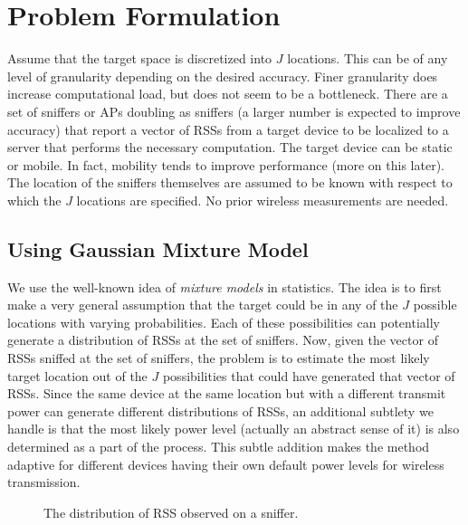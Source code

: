 
\section{Problem Formulation}
\label{sec:problemformulation}

Assume that the target space is discretized into $J$ locations. 
This can be of any level of granularity 
depending on the desired accuracy. Finer granularity does increase computational load, but does not seem to be a bottleneck. There are a set of sniffers or APs doubling as sniffers (a larger number is expected to improve accuracy) that report a vector of RSSs from a target device to be localized to a server that performs the necessary computation. The target device can be static or mobile. In fact, mobility tends to improve performance (more on this later). The location of the sniffers themselves are assumed to be known with respect to which the $J$ locations
are specified. No prior wireless measurements are needed.

\subsection{Using Gaussian Mixture Model}
We use the well-known idea of {\em mixture models} in statistics. The idea is to first make a very general assumption that the target could be in any of the $J$ possible locations with varying probabilities. Each of these possibilities can potentially generate a distribution of RSSs
at the set of sniffers. Now, given the vector of RSSs sniffed at the set of sniffers, the problem is to estimate the most likely target 
location out of the $J$ possibilities that could have generated that vector of RSSs. Since 
the same device at the same location but with a different transmit power can generate different distributions of RSSs, an additional subtlety we handle is that the
most likely power level (actually an abstract sense of it) is also
determined as a part of the process. This subtle addition makes the
method adaptive for different devices having their own default power
levels for wireless transmission.

\begin{figure} 
\centering
{} 
\caption{The distribution of RSS observed on a sniffer.}
\label{fig:distribution}
\end{figure}

